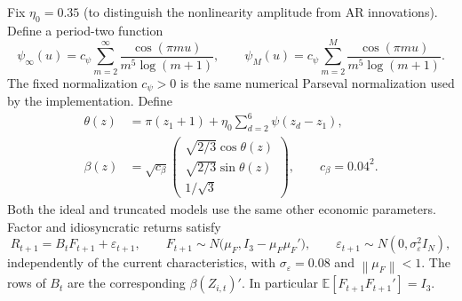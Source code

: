 \documentclass[11pt,a4paper]{article}
\theoremstyle{remark}
\newcommand{\E}{\mathbb E}
\newcommand{\norm}[1]{\left\lVert#1\right\rVert}
\begin{document}
Fix $\eta_0=0.35$ (to distinguish the nonlinearity amplitude from AR innovations). Define a period-two function
\begin{equation}\label{eq:psi}
 \psi_\infty(u)=c_\psi\sum_{m=2}^\infty
    \frac{\cos(\pi m u)}{m^5\log(m+1)},\qquad
 \psi_M(u)=c_\psi\sum_{m=2}^{M}
    \frac{\cos(\pi m u)}{m^5\log(m+1)}.
\end{equation}
The fixed normalization $c_\psi>0$ is the same numerical Parseval normalization used by the implementation. Define
\begin{align}
 \theta(z)&=\pi(z_1+1)+\eta_0\sum_{d=2}^6\psi(z_d-z_1),\label{eq:theta}\\
 \beta(z)&=\sqrt{c_\beta}
 \begin{pmatrix}\sqrt{2/3}\cos\theta(z)\\ \sqrt{2/3}\sin\theta(z)\\ 1/\sqrt3\end{pmatrix},
 \qquad c_\beta=0.04^2 . \label{eq:beta}
\end{align}
Both the ideal and truncated models use the same other economic parameters. Factor and idiosyncratic returns satisfy
\begin{equation}
 R_{t+1}=B_t F_{t+1}+\varepsilon_{t+1},\qquad
 F_{t+1}\sim N\bigl(\mu_F,I_3-\mu_F\mu_F'\bigr),\qquad
 \varepsilon_{t+1}\sim N(0,\sigma_\varepsilon^2 I_N),
\end{equation}
independently of the current characteristics, with $\sigma_\varepsilon=0.08$ and $\norm{\mu_F}<1$. The rows of $B_t$ are the corresponding $\beta(Z_{i,t})'$. In particular $\E[F_{t+1}F_{t+1}']=I_3$.
\end{document}
